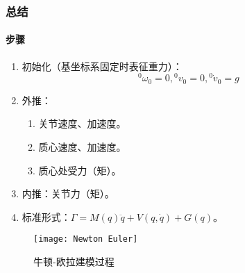 \documentclass[
12pt, %
a4paper, 
oneside, %
headinclude,footinclude, %
]{scrartcl}
\begin{document}
\subsubsection[总结]{总结}
\noindent
\begin{minipage}{0.6\textwidth}
\paragraph{步骤}
\begin{enumerate}
\item 初始化（基坐标系固定时表征重力）：
$$ {}^0 \omega_0 = 0, {}^0 v_0 = 0, {}^0 \dot{v}_0 = g $$
\item 外推：
\begin{enumerate}
\item 关节速度、加速度。
\item 质心速度、加速度。
\item 质心处受力（矩）。
\end{enumerate}
\item 内推：关节力（矩）。
\item 标准形式：$ \Gamma = M(q) \ddot{q} + V(q, \dot{q}) + G(q) $。
\end{enumerate}
\end{minipage}
\begin{minipage}{0.4\textwidth}
\begin{figure}[H]
\centering 
\texttt{[image: Newton Euler]} 
\caption{牛顿-欧拉建模过程}
\end{figure}
\end{minipage}
\end{document}
